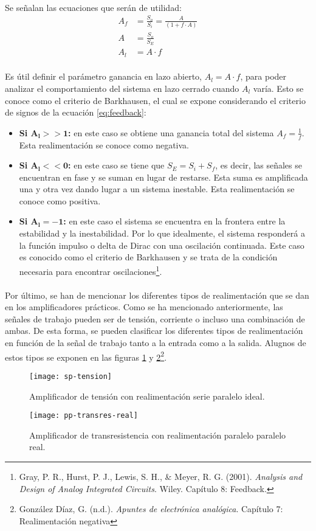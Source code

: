 \paragraph{}
Se señalan las ecuaciones que ser\'an de utilidad:
\begin{align}
   \label{eq:feedback}
   A_f &= \frac{S_o}{S_i} = \frac{A}{(1 + f \cdot A)} \\
   \label{eq:A}
   A &= \frac{S_o}{S_E} \\
   \label{eq:Al}
   A_l &= A \cdot f
\end{align}
\paragraph{}
Es útil definir el par\'ametro ganancia en lazo abierto, $A_l = A \cdot f$, para poder analizar el comportamiento del sistema en lazo cerrado cuando $A_l$ var\'ia. Esto se conoce como el criterio de Barkhausen, el cual se expone considerando el criterio de signos de la ecuaci\'on \ref{eq:feedback}:
\begin{itemize}
   \item \textbf{Si $\mathbf {A_l >> 1}$:} en este caso se obtiene una ganancia total del sistema $A_f = \frac{1}{f}$. Esta realimentación se conoce como negativa.
   \item \textbf{Si $\mathbf{A_l << 0}$:} en este caso se tiene que $S_E = S_i + S_f$, es decir, las señales se encuentran en fase y se suman en lugar de restarse. Esta suma es amplificada una y otra vez dando lugar a un sistema inestable. Esta realimentación se conoce como positiva.
   \item \textbf{Si $\mathbf{A_l = -1}$:} en este caso el sistema se encuentra en la frontera entre la estabilidad y la inestabilidad. Por lo que idealmente, el sistema responder\'a a la funci\'on impulso o delta de Dirac con una oscilaci\'on continuada. Este caso es conocido como el criterio de Barkhausen y se trata de la condici\'on necesaria para encontrar oscilaciones\footnote{Gray, P. R., Hurst, P. J., Lewis, S. H., & Meyer, R. G. (2001). \textit{Analysis and Design of Analog Integrated Circuits}. Wiley. Capítulo 8: Feedback.}.
\end{itemize}
\paragraph{}
Por último, se han de mencionar los diferentes tipos de realimentación que se dan en los amplificadores prácticos. Como se ha mencionado anteriormente, las señales de trabajo pueden ser de tensión, corriente o incluso una combinación de ambas. De esta forma, se pueden clasificar los diferentes tipos de realimentación en función de la señal de trabajo tanto a la entrada como a la salida. Alugnos de estos tipos se exponen en las figuras \ref{fig:sp} y \ref{fig:pp}\footnote{González Díaz, G. (n.d.). \textit{Apuntes de electrónica analógica}. Cap\'itulo 7: Realimentaci\'on negativa}.
\begin{figure}[H]
    \centering
    \texttt{[image: sp-tension]}
    \caption{Amplificador de tensión con realimentaci\'on serie paralelo ideal.} 
    \label{fig:sp}
\end{figure}

\begin{figure}[H]
    \centering
    \texttt{[image: pp-transres-real]}
    \caption{Amplificador de transresistencia con realimentación paralelo paralelo real.} 
    \label{fig:pp}
\end{figure}
